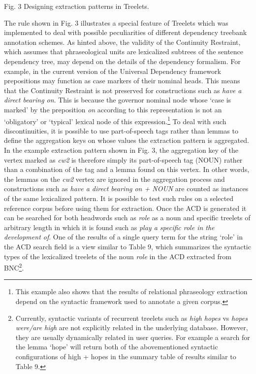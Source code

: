 \documentclass[12pt]{article}
\newenvironment{styleStandard}{\setlength\leftskip{0cm}\setlength\rightskip{0cm plus 1fil}\setlength\parindent{0cm}\setlength\parfillskip{0pt plus 1fil}\setlength\parskip{0in plus 1pt}\writerlistparindent\writerlistleftskip\leavevmode\normalfont\normalsize\writerlistlabel\ignorespaces}{\unskip\vspace{0.111in plus 0.0111in}\par}
\newcommand\writerlistleftskip{}
\newcommand\writerlistparindent{}
\newcommand\writerlistlabel{}
\begin{document}
\begin{styleStandard}
Fig. 3 Designing extraction patterns in Treelets.
\end{styleStandard}

\begin{styleStandard}
The rule shown in Fig. 3 illustrates a special feature of Treelets which was implemented to deal with possible peculiarities of different dependency treebank annotation schemes. As hinted above, the validity of the Continuity Restraint, which assumes that phraseological units are lexicalized subtrees of the sentence dependency tree, may depend on the details of the dependency formalism. For example, in the current version of the Universal Dependency framework prepositions may function as case markers of their nominal heads. This means that the Continuity Restraint is not preserved for constructions such as \textit{have a direct bearing on}. This is because the governor nominal node whose ‘case is marked’ by the preposition \textit{on} according to this representation is not an ‘obligatory’ or ‘typical’ lexical node of this expression.\footnote{ This example also shows that the results of relational phraseology extraction depend on the syntactic framework used to annotate a given corpus.} To deal with such discontinuities, it is possible to use part-of-speech tags rather than lemmas to define the aggregation keys on whose values the extraction pattern is aggregated. In the example extraction pattern shown in Fig. 3, the aggregation key of the vertex marked as \textit{cw2} is therefore simply its part-of-speech tag (NOUN) rather than a combination of the tag and a lemma found on this vertex. In other words, the lemmas on the \textit{cw2} vertex are ignored in the aggregation process and constructions such as \textit{have a direct bearing on + NOUN} are counted as instances of the same lexicalized pattern. It is possible to test such rules on a selected reference corpus before using them for extraction. Once the ACD is generated it can be searched for both headwords such as \textit{role} as a noun and specific treelets of arbitrary length in which it is found such as \textit{play a specific role in the development of}. One of the results of a single query term for the string ‘role’ in the ACD search field is a view similar to Table 9, which summarizes the syntactic types of the lexicalized treelets of the noun \textit{role} in the ACD extracted from BNC\footnote{ \textrm{Currently, syntactic variants of recurrent treelets such as }\textrm{\textit{high hopes}}\textrm{ vs }\textrm{\textit{hopes were/are high}}\textrm{ are not explicitly related in the underlying database. However, they are usually dynamically related in user queries. For example a search for the lemma ‘hope’ will return both of the abovementioned syntactic configurations of high + hopes in the summary table of results similar to Table 9.}}. 
\end{styleStandard}
\end{document}
